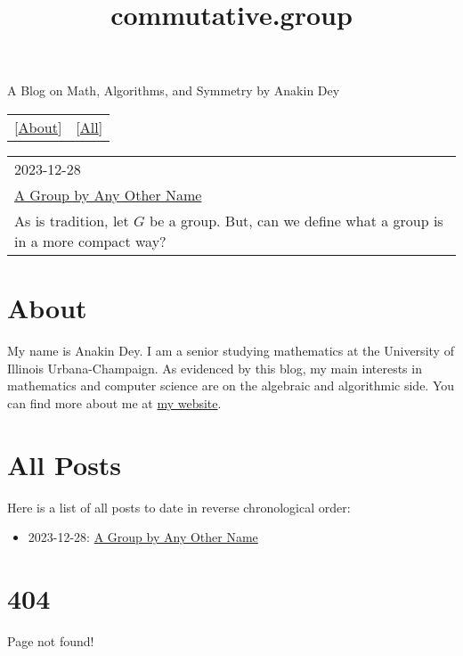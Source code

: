 \documentclass{article}
\title{commutative.group}
\begin{document}
\maketitle
\newline
\begin{center}
  A Blog on Math, Algorithms, and Symmetry by Anakin Dey
\end{center}
\begin{table}
  \centering
  \begin{tabular}{cc}
    \LARGE[\href{About.html}{About}] & \LARGE[\href{All-Posts.html}{All}]
  \end{tabular}
\end{table}


\begin{table}
  \centering
  \begin{tabular}{|l|}
    \hline
    \large 2023-12-28 \\
    \LARGE \href{posts/other_name.html}{A Group by Any Other Name} \\
    As is tradition, let $G$ be a group. But, can we define what a group is in a more compact way? \\
    \hline
  \end{tabular}
\end{table}

\part*{\centering About}

\newline

My name is Anakin Dey.
I am a senior studying mathematics at the University of Illinois Urbana-Champaign.
As evidenced by this blog, my main interests in mathematics and computer science are on the algebraic and algorithmic side.
You can find more about me at \href{https://www.anakin-dey.com/}{my website}.

\part*{\centering All Posts}

\newline

Here is a list of all posts to date in reverse chronological order:

\begin{itemize}
\item 2023-12-28: \href{posts/other_name.html}{A Group by Any Other Name}
\end{itemize}

\part*{404}

\newline

Page not found!
\end{document}
